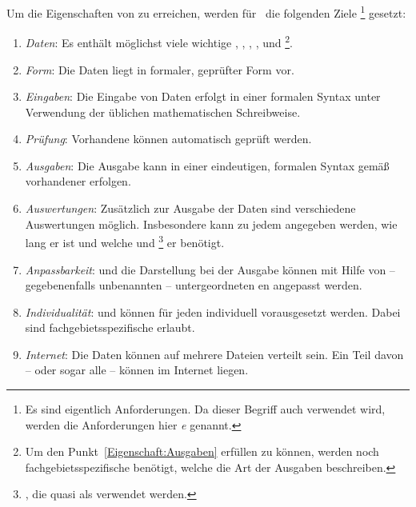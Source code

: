 Um die Eigenschaften von  zu erreichen, werden für \ASBA\ die folgenden Ziele%
\footnote{%
	Es sind eigentlich Anforderungen.
	Da dieser Begriff auch  verwendet wird, werden die Anforderungen hier \emph{}\emph{e} genannt.%
}
gesetzt:
\begin{enumerate}
	\item \label{Ziel:Daten} \emph{Daten}:
	Es enthält möglichst viele wichtige , , , ,  und %
	\footnote{%
		Um den Punkt~\ref{Eigenschaft:Ausgaben}  erfüllen zu können, werden noch fachgebietsspezifische  benötigt, welche die Art der Ausgaben beschreiben.%
	}.
	\item \label{Ziel:Form} \emph{Form}:
	Die Daten liegt in formaler, geprüfter Form vor.
	\item \label{Ziel:Eingaben} \emph{Eingaben}:
	Die Eingabe von Daten erfolgt in einer formalen Syntax unter Verwendung der üblichen mathematischen Schreibweise.
	\item \label{Ziel:Prüfung} \emph{Prüfung}:
	Vorhandene  können automatisch geprüft werden.
	\item \label{Ziel:Ausgaben} \emph{Ausgaben}:
	Die Ausgabe kann in einer eindeutigen, formalen Syntax gemäß vorhandener  erfolgen.
	\item \label{Ziel:Auswertungen} \emph{Auswertungen}:
	Zusätzlich zur Ausgabe der Daten sind verschiedene Auswertungen möglich.
	Insbesondere kann zu jedem  angegeben werden, wie lang er ist und welche  und %
	\footnote{
		, die quasi als  verwendet werden.%
	}
	er benötigt.
	\item \label{Ziel:Anpassbarkeit} \emph{Anpassbarkeit}:
	 und die Darstellung bei der Ausgabe können mit Hilfe von -- gegebenenfalls unbenannten -- untergeordneten en angepasst werden.
	\item \label{Ziel:Individualität} \emph{Individualität}:
	 und  können für jeden  individuell vorausgesetzt werden.
	Dabei sind fachgebietsspezifische  erlaubt.
	\item \label{Ziel:Internet} \emph{Internet}:
	Die Daten können auf mehrere Dateien verteilt sein.
	Ein Teil davon -- oder sogar alle -- können im Internet liegen.

\end{enumerate}
